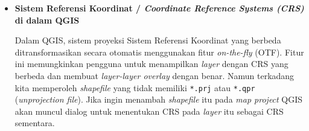 \begin{itemize}
    Sistem proyeksi yang umum digunakan di Indonesia adalah \textbf{UTM (Universal Transverse Mercator)}. Untuk UTM, bumi kemudian dibagi ke dalam beberapa zona, antara 01 sampai dengan 60 dengan satuan meter. Pada sistem koordinat bumi akan dibagi menjadi dua bagian, di atas khatulistiwa sebagai bagian utara dengan simbol (N) serta di bagian selatan khatulistiwa di beri simbol (S).
    
    Sistem referensi koordinat yang paling cocok untuk seluruh wilayah di Indonesia adalah \textit{Geographic Coordinate System} yaitu WGS1984 (WGS84 / EPSG:4326). Sedangkan untuk wilayah satu provinsi atau lebih kecil sistem referensi koordinat yang paling cocok adalah \textbf{sistem koordinat terproyeksi} yaitu UTM WGS84. Contoh, untuk Jogja dan Jawa Tengah menggunakan UTM Zona 49S (WGS84 / UTM Zone 49S / EPSG:32749), seperti terlihat pada gambar \ref{fig:utmindonesia}.
    
    \begin{figure}[H]
      \centering
      \texttt{[image: ./resources/017-utm-indonesia]}
      \caption{Zona UTM di Indonesia}
      \label{fig:utmindonesia}
    \end{figure}
    
  \item \textbf{Sistem Referensi Koordinat / \textit{Coordinate Reference Systems (CRS)} di dalam QGIS}
  
    Dalam QGIS, sistem proyeksi Sistem Referensi Koordinat yang berbeda ditransformasikan secara otomatis menggunakan fitur \textit{on-the-fly} (OTF). Fitur ini memungkinkan pengguna untuk menampilkan \textit{layer} dengan CRS yang berbeda dan membuat \textit{layer-layer overlay} dengan benar. Namun terkadang kita memperoleh \textit{shapefile} yang tidak memiliki \verb|*.prj| atau \verb|*.qpr| (\textit{unprojection file}). Jika ingin menambah \textit{shapefile} itu pada \textit{map project} QGIS akan muncul dialog untuk menentukan CRS pada \textit{layer} itu sebagai CRS sementara. 


\end{itemize}